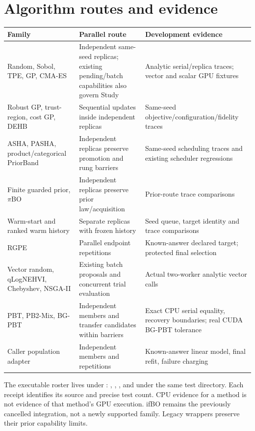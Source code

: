 \section{Algorithm routes and evidence}
\begin{longtable}{p{}p{}p{}}
\toprule Family & Parallel route & Development evidence \\
\midrule\endhead
Random, Sobol, TPE, GP, CMA-ES & Independent same-seed replicas; existing pending/batch capabilities also govern Study & Analytic serial/replica traces; vector and scalar GPU fixtures \\
Robust GP, trust-region, cost GP, DEHB & Sequential updates inside independent replicas & Same-seed objective/configuration/fidelity traces \\
ASHA, PASHA, product/categorical PriorBand & Independent replicas preserve promotion and rung barriers & Same-seed scheduling traces and existing scheduler regressions \\
Finite guarded prior, $\pi$BO & Independent replicas preserve prior law/acquisition & Prior-route trace comparisons \\
Warm-start and ranked warm history & Separate replicas with frozen history & Seed queue, target identity and trace comparisons \\
RGPE & Parallel endpoint repetitions & Known-answer declared target; protected final selection \\
Vector random, qLogNEHVI, Chebyshev, NSGA-II & Existing batch proposals and concurrent trial evaluation & Actual two-worker analytic vector calls \\
PBT, PB2-Mix, BG-PBT & Independent members and transfer candidates within barriers & Exact CPU serial equality, recovery boundaries; real CUDA BG-PBT tolerance \\
Caller population adapter & Independent members and repetitions & Known-answer linear model, final refit, failure charging \\
\bottomrule
\end{longtable}
The executable roster lives under : ,
, ,
 and  under the
same test directory. Each receipt identifies its source and precise test count.
CPU evidence for a method is not evidence of that method's GPU execution.
ifBO remains the previously cancelled integration, not a newly supported family.
Legacy wrappers preserve their prior capability limits.

